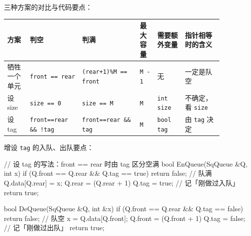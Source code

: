 \documentclass[11pt,openany,UTF8]{ctexbook}
\begin{document}
三种方案的对比与代码要点：

\begingroup\small\setlength{\tabcolsep}{4.0pt}
\begin{longtable}{@{}L{0.0926\linewidth}L{0.2095\linewidth}L{0.2339\linewidth}L{0.0780\linewidth}L{0.1121\linewidth}L{0.1510\linewidth}@{}}
\toprule
\textbf{方案} & \textbf{判空} & \textbf{判满} & \textbf{最大容量} & \textbf{需要额外变量} & \textbf{指针相等时的含义} \\
\midrule
\endhead
牺牲一个单元 & \texttt{front =\allowbreak{}=\allowbreak{} rear} & \texttt{(rear+\allowbreak{}1)\allowbreak{}\%M =\allowbreak{}=\allowbreak{} front} & \texttt{M - 1} & 无 & 一定是队空 \\
设 size & \texttt{size =\allowbreak{}=\allowbreak{} 0} & \texttt{size =\allowbreak{}=\allowbreak{} M} & \texttt{M} & \texttt{int size} & 不确定，看 \texttt{size} \\
设 tag & \texttt{front=\allowbreak{}=\allowbreak{}rear \&\& !tag} & \texttt{front=\allowbreak{}=\allowbreak{}rear \&\& tag} & \texttt{M} & \texttt{bool tag} & 由 \texttt{tag} 决定 \\
\bottomrule
\end{longtable}
\endgroup


增设 \texttt{tag} 的入队、出队要点：

\begin{codebox}
// 设 tag 的写法：front == rear 时由 tag 区分空满
bool EnQueue(SqQueue &Q, int x) {
    if (Q.front == Q.rear && Q.tag == true) return false;  // 队满
    Q.data[Q.rear] = x;
    Q.rear = (Q.rear + 1) %
    Q.tag = true;                                          // 记「刚做过入队」
    return true;
}

bool DeQueue(SqQueue &Q, int &x) {
    if (Q.front == Q.rear && Q.tag == false) return false; // 队空
    x = Q.data[Q.front];
    Q.front = (Q.front + 1) %
    Q.tag = false;                                         // 记「刚做过出队」
    return true;
}
\end{codebox}
\end{document}
